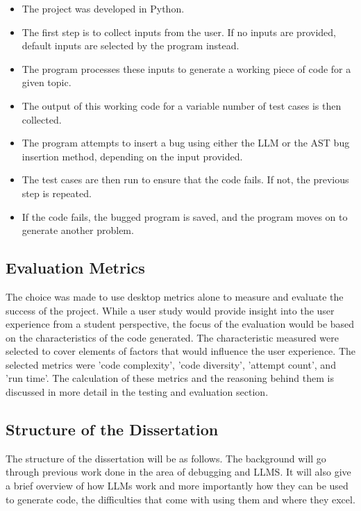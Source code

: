 \documentclass[12pt]{extarticle}
\begin{document}
\begin{itemize}
    \item The project was developed in Python.
    \item The first step is to collect inputs from the user. If no inputs are provided, default inputs are selected by the program instead.
    \item The program processes these inputs to generate a working piece of code for a given topic.
    \item The output of this working code for a variable number of test cases is then collected.
    \item The program attempts to insert a bug using either the LLM or the AST bug insertion method, depending on the input provided.
    \item The test cases are then run to ensure that the code fails. If not, the previous step is repeated.
    \item If the code fails, the bugged program is saved, and the program moves on to generate another problem.
\end{itemize}

\subsection{Evaluation Metrics}

The choice was made to use desktop metrics alone to measure and evaluate the success of the project. While a user study would provide insight into the user experience from a student perspective, the focus of the evaluation would be based on the characteristics of the code generated. The characteristic measured were selected to cover elements of factors that would influence the user experience. The selected metrics were 'code complexity', 'code diversity', 'attempt count', and 'run time'. The calculation of these metrics and the reasoning behind them is discussed in more detail in the testing and evaluation section.

\subsection{Structure of the Dissertation}

The structure of the dissertation will be as follows. The background will go through previous work done in the area of debugging and LLMS. It will also give a brief overview of how LLMs work and more importantly how they can be used to generate code, the difficulties that come with using them and where they excel. 
\end{document}
